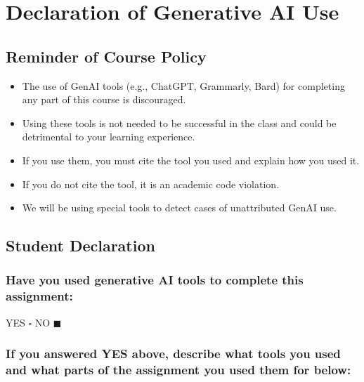 \documentclass[11pt]{article}
\begin{document}
\pagebreak

\section*{Declaration of Generative AI Use}

\subsection*{Reminder of Course Policy}

\begin{itemize}
    \item The use of GenAI tools (e.g., ChatGPT, Grammarly, Bard) for completing any part of this course is discouraged.
    \item Using these tools is not needed to be successful in the class and could be detrimental to your learning experience.
    \item If you use them, you must cite the tool you used and explain how you used it.
    \item If you do not cite the tool, it is an academic code violation.
    \item We will be using special tools to detect cases of unattributed GenAI use.
\end{itemize}

\subsection*{Student Declaration}

\subsubsection*{Have you used generative AI tools to complete this assignment:}


YES $\square$ NO $\blacksquare$ %


\subsubsection*{If you answered YES above, describe what tools you used and what parts of the assignment you used them for below:}

\end{document}
